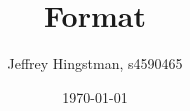 \documentclass[a4paper, 12pt]{article}
\begin{document}
	\title{Format} 
	\date{\today}
	\author{Jeffrey Hingstman, s4590465}	\maketitle
\end{document}

